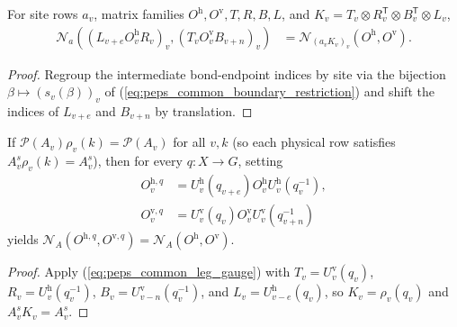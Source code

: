 \begin{lemma}%
    \label{thm:peps_four_cut_common_leg_gauge}
    \leanok
    For site rows $a_v$, matrix families $O^{\mathrm h},O^{\mathrm v},T,R,B,L$,
    and $K_v=T_v\otimes R_v^{\mathsf T}\otimes B_v^{\mathsf T}\otimes L_v$,
    \begin{align}
        \mathcal N_a((L_{v+e}O^{\mathrm h}_vR_v)_v,
        (T_vO^{\mathrm v}_vB_{v+n})_v)
         & =\mathcal N_{(a_vK_v)_v}(O^{\mathrm h},O^{\mathrm v}).
        \label{eq:peps_common_leg_gauge}
    \end{align}
\end{lemma}
\begin{proof}\leanok
    Regroup the intermediate bond-endpoint indices by site via the bijection
    $\beta\mapsto(s_v(\beta))_v$ of (\ref{eq:peps_common_boundary_restriction})
    and shift the indices of $L_{v+e}$ and $B_{v+n}$ by translation.
\end{proof}

\begin{lemma}%
    \label{thm:peps_four_cut_common_vertex_gauge}
    \leanok
    If $\mathcal P(A_v)\rho_v(k)=\mathcal P(A_v)$ for all $v,k$ (so each
    physical row satisfies $A_v^s\rho_v(k)=A_v^s$), then for every $q:X\to G$,
    setting
    \begin{align}
        O^{\mathrm h,q}_v
         & =U^{\mathrm h}_v(q_{v+e})O^{\mathrm h}_vU^{\mathrm h}_v(q_v^{-1}),
        \label{eq:peps_common_gauged_horizontal}                              \\
        O^{\mathrm v,q}_v
         & =U^{\mathrm v}_v(q_v)O^{\mathrm v}_vU^{\mathrm v}_v(q_{v+n}^{-1})
        \label{eq:peps_common_gauged_vertical}
    \end{align}
    yields $\mathcal N_A(O^{\mathrm h,q},O^{\mathrm v,q})=\mathcal N_A(O^{\mathrm h},O^{\mathrm v})$.
\end{lemma}
\begin{proof}\leanok
    Apply (\ref{eq:peps_common_leg_gauge}) with $T_v=U^{\mathrm v}_v(q_v)$,
    $R_v=U^{\mathrm h}_v(q_v^{-1})$, $B_v=U^{\mathrm v}_{v-n}(q_v^{-1})$, and
    $L_v=U^{\mathrm h}_{v-e}(q_v)$, so $K_v=\rho_v(q_v)$ and
    $A_v^s K_v=A_v^s$.
\end{proof}


